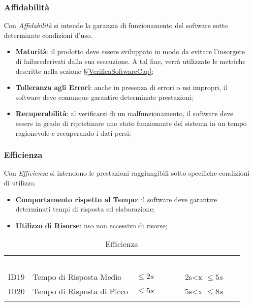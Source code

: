 \subsubsection{Affidabilità}

Con \textit{Affidabilità} si intende la garanzia di funzionamento del software sotto determinate condizioni d'uso. 

\begin{itemize}
	\item \textbf{Maturità}: il prodotto deve essere sviluppato in modo da evitare l'insorgere di failure\glossario derivati dalla sua esecuzione. A tal fine, verrà utilizzate le metriche descritte nella sezione §\ref{VerificaSoftwareCap};
	\item \textbf{Tolleranza agli Errori}: anche in presenza di errori o usi impropri, il software deve comunque garantire determinate prestazioni;
	\item \textbf{Recuperabilità}: al verificarsi di un malfunzionamento, il software deve essere in grado di ripristinare uno stato funzionante del sistema in un tempo ragionevole e recuperando i dati persi;
\end{itemize}


\subsubsection{Efficienza}

Con \textit{Efficienza} si intendono le prestazioni raggiungibili sotto specifiche condizioni di utilizzo. 

\begin{itemize}
	\item \textbf{Comportamento rispetto al Tempo}: il software deve garantire determinati tempi di risposta ed elaborazione;
	\item \textbf{Utilizzo di Risorse}: uso non eccessivo di risorse;
\end{itemize}

\begin{longtable}{|C{.15\textwidth}|C{.24\textwidth}|C{.24\textwidth}|C{.24\textwidth}|}
\hline
{}\textbf{\textcolor{white}{ID}} & \textbf{\textcolor{white}{Nome}} & \textbf{\textcolor{white}{Ottimalità}} & \textbf{\textcolor{white}{Accettabilità}}\\
ID19 & Tempo di Risposta Medio & $\leq 2s$ & 2s<x $\leq 5s$\\
\hline
{}ID20 & Tempo di Risposta di Picco  & $\leq 5s$ & 5s<x $\leq 8s$ \\ 
\hline
\caption{Efficienza}
\label{Efficienza}
\end{longtable}

